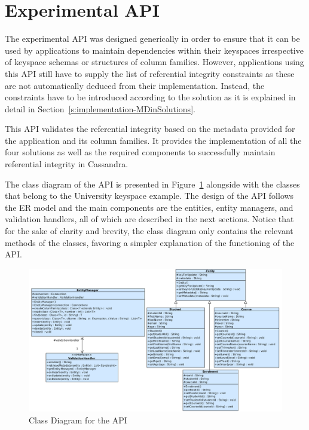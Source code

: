 \section{Experimental API}\label{s:implementation-API}

The experimental \ac{API} was designed generically in order to ensure that it
can be used by  applications to maintain dependencies within their keyspaces
irrespective of keyspace schemas or structures of column families.  However,
applications using this \ac{API} still have to supply  the list of referential
integrity constraints as these are not automatically deduced from their
implementation. Instead, the constraints have to be introduced according to the
solution as it is explained in detail in
Section~\ref{s:implementation-MDinSolutions}.


This \ac{API} validates the referential integrity based on the metadata provided
for the application and its column families.   It  provides the implementation of
all the four solutions as well as the required components to successfully
maintain referential integrity in Cassandra.

The  class diagram of the \ac{API} is presented  in
 Figure~\ref{f:classDiagram} alongside with the  classes that belong to 
the University keyspace example.  The design of the \ac{API} follows the
\ac{ER} model and the main components are the entities, entity managers,  and
validation handlers,  all of which are described in the next sections.
 Notice that for the sake of clarity and brevity,   the class diagram only
 contains  the relevant  methods of the classes,  favoring a simpler
explanation of the functioning of the \ac{API}. 

\begin{figure}  
	\centering
	\includegraphics[width=\textwidth]{./figure/uml/class-diagram.png}
	\caption{Class Diagram for the \ac{API}}\label{f:classDiagram}
\end{figure}

